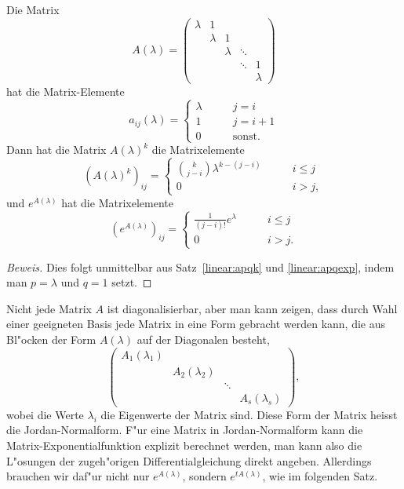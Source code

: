 \begin{satz}
\label{linear:jnfexp}
Die Matrix
\[
A(\lambda)=\begin{pmatrix}
\lambda&      1&       &      &       \\
       &\lambda&      1&      &       \\
       &       &\lambda&\ddots&       \\
       &       &       &\ddots&      1\\
       &       &       &      &\lambda
\end{pmatrix}
\]
hat die Matrix-Elemente
\[
a_{ij}(\lambda)=\begin{cases}
\lambda&\qquad j=i\\
      1&\qquad j=i+1\\
      0&\qquad \text{sonst.}
\end{cases}
\]
Dann hat die Matrix $A(\lambda)^k$ die Matrixelemente
\begin{equation}
(A(\lambda)^k)_{ij}=\begin{cases}
\displaystyle \binom{k}{j-i}\lambda^{k-(j-i)}&\qquad i\le j\\
0&\qquad i > j,
\end{cases}
\label{linear:ahochk}
\end{equation}
und $e^{A(\lambda)}$ hat die Matrixelemente
\[
(e^{A(\lambda)})_{ij}
=
\begin{cases}
\frac{1}{(j-i)!}e^\lambda &\qquad i\le j\\
0                         &\qquad i>j.
\end{cases}
\]
\end{satz}

\begin{proof}[Beweis]
Dies folgt unmittelbar aus Satz~\ref{linear:apqk} und \ref{linear:apqexp},
indem man $p=\lambda$ und $q=1$ setzt.
\end{proof}

Nicht jede Matrix $A$ ist diagonalisierbar, aber man kann zeigen, dass
durch Wahl einer geeigneten Basis jede Matrix in eine Form gebracht
werden kann, die aus Bl"ocken der Form $A(\lambda)$ auf der Diagonalen
besteht,
\[
\begin{pmatrix}
A_1(\lambda_1)&              &      &              \\
              &A_2(\lambda_2)&      &              \\
              &              &\ddots&              \\
              &              &      &A_s(\lambda_s)
\end{pmatrix},
\]
wobei die Werte $\lambda_i$ die Eigenwerte der Matrix sind.
Diese Form der Matrix heisst die Jordan-Normalform.
F"ur eine Matrix in Jordan-Normalform kann die Matrix-Exponentialfunktion
explizit berechnet werden, man kann also die L"osungen der
zugeh"origen Differentialgleichung direkt angeben.
Allerdings brauchen wir daf"ur nicht nur $e^{A(\lambda)}$, sondern
$e^{tA(\lambda)}$, wie im folgenden Satz.

